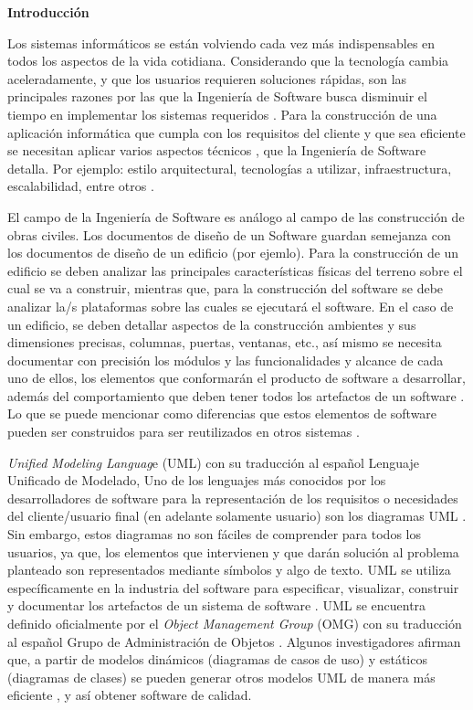 \begin{center}
	\textbf{ {\titulodc Introducción}}
\end{center}

Los sistemas informáticos se están volviendo cada vez más indispensables en todos los aspectos de la vida cotidiana. Considerando que la tecnología cambia aceleradamente, y que los usuarios requieren soluciones rápidas, son las principales razones por las que la Ingeniería de Software busca disminuir el tiempo en implementar los sistemas requeridos \parencite{Panthi2022}. Para la construcción de una aplicación informática que cumpla con los requisitos del cliente y que sea eficiente se necesitan aplicar varios aspectos técnicos \parencite{Chen2022}, que la Ingeniería de Software detalla. Por ejemplo: estilo arquitectural, tecnologías a utilizar, infraestructura, escalabilidad, entre otros \parencite{Kulesza2020}.

El campo de la Ingeniería de Software es análogo al campo de las construcción de obras civiles. Los documentos de diseño de un Software guardan semejanza con los documentos de diseño de un edificio (por ejemlo). Para la construcción de un edificio se deben analizar las principales características físicas del terreno sobre el cual se va a construir, mientras que, para la construcción del software se debe analizar la/s plataformas sobre las cuales se ejecutará el software. En el caso de un edificio, se deben detallar aspectos de la construcción ambientes y sus dimensiones precisas, columnas, puertas, ventanas, etc., así mismo se necesita documentar con precisión los módulos y las funcionalidades y alcance de cada uno de ellos, los elementos que conformarán el producto de software a desarrollar, además del comportamiento que deben tener todos los artefactos de un software \parencite{Hamdi2022}. Lo que se puede mencionar como diferencias que estos elementos de software pueden ser construidos para ser reutilizados en otros sistemas \parencite{Guerra2021}.

\textit{Unified Modeling Languag}e (UML) con su traducción al español Lenguaje Unificado de Modelado, Uno de los lenguajes más conocidos por los desarrolladores de software para la representación de los requisitos o necesidades del cliente/usuario final (en adelante solamente usuario) son los diagramas UML \parencite{OMGUML24}. Sin embargo, estos diagramas no son fáciles de comprender para todos los usuarios, ya que, los elementos que intervienen y que darán solución al problema planteado son representados mediante símbolos y algo de texto. UML se utiliza específicamente en la industria del software para especificar, visualizar, construir y documentar los artefactos de un sistema de software \parencite{Bergstrom2022}. UML se encuentra definido oficialmente por el \textit{Object Management Group} (OMG) con su traducción al español Grupo de Administración de Objetos \parencite{Omg2009}. Algunos investigadores afirman que, a partir de modelos dinámicos (diagramas de casos de uso) y estáticos (diagramas de clases) se pueden generar otros modelos UML de manera más eficiente \parencite{Jahan2021}, y así obtener software de calidad.

